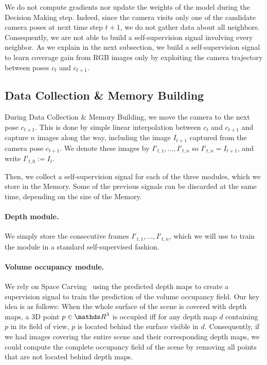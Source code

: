 We do not compute gradients nor update the weights of the model during the Decision Making step. Indeed, since the camera visits only one of the candidate camera poses at next time step $t+1$, we do not gather data about all neighbors. Consequently, we are not able to build a self-supervision signal involving every neighbor. As we explain in the next subsection, we build a self-supervision signal to learn coverage gain from RGB images only by exploiting the camera trajectory between poses $c_t$ and $c_{t+1}$.

\subsection{Data Collection \& Memory Building}

During Data Collection \& Memory Building, we move the camera to the next pose $c_{t+1}$. This is done by simple linear interpolation between $c_t$ and $c_{t+1}$ and capture $n$ images along the way, including the image $I_{t+1}$ captured from the camera pose $c_{t+1}$. 
We denote these images by $I'_{t,1}, ..., I'_{t,n}$ so  $I'_{t, n} = I_{t+1}$, and write $I'_{t, 0} := I_t$.

Then, we collect a self-supervision signal for each of the three modules, which we store in the Memory. Some of the previous signals can be discarded at the same time, depending on the size of the Memory.

\paragraph{Depth module.} We simply store the consecutive frames $I'_{t,1}, ..., I'_{t,n}$, which we will use to train the module in a standard self-supervised fashion.

\paragraph{Volume occupancy module.} We rely on Space Carving~\cite{kutulakos00space} using the predicted depth maps to create a supervision signal to train the prediction of the volume occupancy field. Our key idea is as follows: When the whole surface of the scene is covered with depth maps, a 3D point $p \in \IR^3$ is occupied iff for any depth map $d$ containing $p$ in its field of view, $p$ is located behind the surface visible in $d$. Consequently, if we had images covering the entire scene and their corresponding depth maps, we could  compute the complete occupancy field of the scene by removing all points that are not located behind depth maps. 

